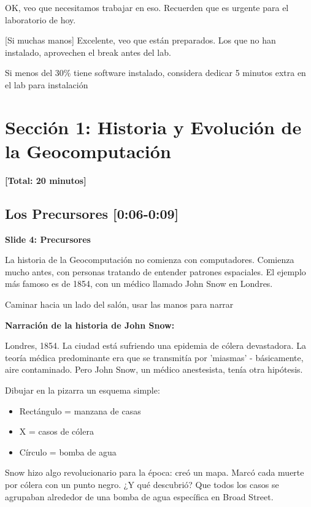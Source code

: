 \documentclass[11pt,a4paper]{article}
\newcommand{\tiempo}[1]{\textcolor{timecolor}{\faIcon{clock} \textbf{[#1]}}}
\newcommand{\decir}[1]{\begin{tcolorbox}[colback=blue!5,colframe=usachblue,title={\faIcon{microphone} DECIR}]#1\end{tcolorbox}}
\newcommand{\hacer}[1]{\begin{tcolorbox}[colback=green!5,colframe=green!50!black,title={\faIcon{hand-point-right} HACER}]#1\end{tcolorbox}}
\newcommand{\alerta}[1]{\begin{tcolorbox}[colback=red!5,colframe=red,title={\faIcon{exclamation-triangle} ALERTA}]#1\end{tcolorbox}}
\begin{document}
\decir{[Si pocas manos] OK, veo que necesitamos trabajar en eso. Recuerden que es urgente para el laboratorio de hoy.

[Si muchas manos] Excelente, veo que están preparados. Los que no han instalado, aprovechen el break antes del lab.}

\alerta{Si menos del 30\% tiene software instalado, considera dedicar 5 minutos extra en el lab para instalación}

\newpage

\section{Sección 1: Historia y Evolución de la Geocomputación}

\tiempo{Total: 20 minutos}

\subsection{Los Precursores \tiempo{0:06-0:09}}

\textbf{Slide 4: Precursores}

\decir{La historia de la Geocomputación no comienza con computadores. Comienza mucho antes, con personas tratando de entender patrones espaciales. El ejemplo más famoso es de 1854, con un médico llamado John Snow en Londres.}

\hacer{Caminar hacia un lado del salón, usar las manos para narrar}

\textbf{Narración de la historia de John Snow:}

\decir{Londres, 1854. La ciudad está sufriendo una epidemia de cólera devastadora. La teoría médica predominante era que se transmitía por 'miasmas' - básicamente, aire contaminado. Pero John Snow, un médico anestesista, tenía otra hipótesis.}

\hacer{Dibujar en la pizarra un esquema simple:
\begin{itemize}
    \item Rectángulo = manzana de casas
    \item X = casos de cólera
    \item Círculo = bomba de agua
\end{itemize}}

\decir{Snow hizo algo revolucionario para la época: creó un mapa. Marcó cada muerte por cólera con un punto negro. ¿Y qué descubrió? Que todos los casos se agrupaban alrededor de una bomba de agua específica en Broad Street.}
\end{document}

